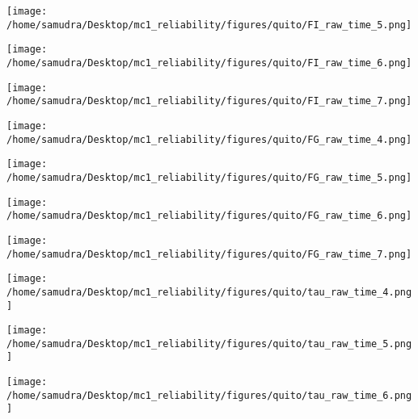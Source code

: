 \documentclass[a4paper]{article}
\def\lthtmlcheckvsize{\ifdim\ht\sizebox<\vsize 
  \ifdim\wd\sizebox<\hsize\expandafter\hfill\fi \expandafter\vfill
  \else\expandafter\vss\fi}%
\begin{document}
{\newpage\clearpage
{}%
\texttt{[image: /home/samudra/Desktop/mc1\_reliability/figures/quito/FI\_raw\_time\_5.png]}%
\lthtmlpictureZ
\lthtmlcheckvsize\clearpage}

{\newpage\clearpage
{}%
\texttt{[image: /home/samudra/Desktop/mc1\_reliability/figures/quito/FI\_raw\_time\_6.png]}%
\lthtmlpictureZ
\lthtmlcheckvsize\clearpage}

{\newpage\clearpage
{}%
\texttt{[image: /home/samudra/Desktop/mc1\_reliability/figures/quito/FI\_raw\_time\_7.png]}%
\lthtmlpictureZ
\lthtmlcheckvsize\clearpage}

{\newpage\clearpage
{}%
\texttt{[image: /home/samudra/Desktop/mc1\_reliability/figures/quito/FG\_raw\_time\_4.png]}%
\lthtmlpictureZ
\lthtmlcheckvsize\clearpage}

{\newpage\clearpage
{}%
\texttt{[image: /home/samudra/Desktop/mc1\_reliability/figures/quito/FG\_raw\_time\_5.png]}%
\lthtmlpictureZ
\lthtmlcheckvsize\clearpage}

{\newpage\clearpage
{}%
\texttt{[image: /home/samudra/Desktop/mc1\_reliability/figures/quito/FG\_raw\_time\_6.png]}%
\lthtmlpictureZ
\lthtmlcheckvsize\clearpage}

{\newpage\clearpage
{}%
\texttt{[image: /home/samudra/Desktop/mc1\_reliability/figures/quito/FG\_raw\_time\_7.png]}%
\lthtmlpictureZ
\lthtmlcheckvsize\clearpage}

{\newpage\clearpage
{}%
\texttt{[image: /home/samudra/Desktop/mc1\_reliability/figures/quito/tau\_raw\_time\_4.png]}%
\lthtmlpictureZ
\lthtmlcheckvsize\clearpage}

{\newpage\clearpage
{}%
\texttt{[image: /home/samudra/Desktop/mc1\_reliability/figures/quito/tau\_raw\_time\_5.png]}%
\lthtmlpictureZ
\lthtmlcheckvsize\clearpage}

{\newpage\clearpage
{}%
\texttt{[image: /home/samudra/Desktop/mc1\_reliability/figures/quito/tau\_raw\_time\_6.png]}%
\lthtmlpictureZ
\lthtmlcheckvsize\clearpage}
\end{document}
